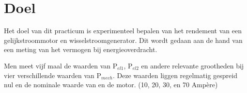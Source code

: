 \section{Doel}
Het doel van dit practicum is experimenteel bepalen van het rendement van een gelijkstroommotor en wisselstroomgenerator. Dit wordt gedaan aan de hand van een meting van het vermogen bij energieoverdracht.

Men meet vijf maal de waarden van P$_{el1}$, P$_{el2}$ en andere relevante grootheden bij vier verschillende waarden van P$_{mech}$. Deze waarden liggen regelmatig gespreid nul en de nominale waarde van en de motor. (10, 20, 30, en 70 Ampère)
